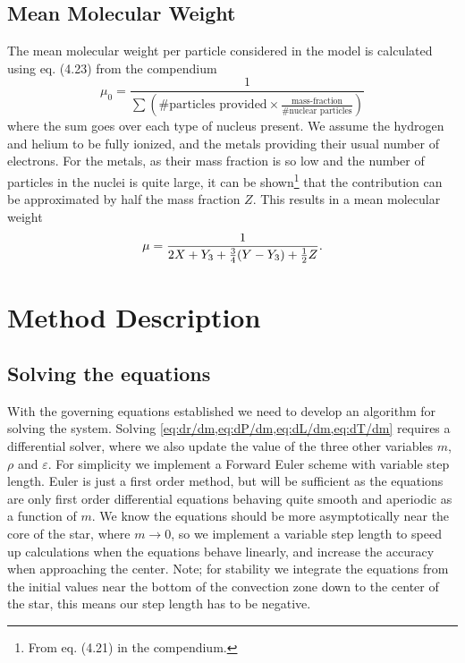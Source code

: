 \documentclass[11pt,a4paper,twocolumn,titlepage]{article}
\newcommand{\half}
{
\frac{1}{2}
}
\begin{document}
\subsection{Mean Molecular Weight} \label{subsec:governing/Mean_molecular_wieght}
The mean molecular weight per particle considered in the model is calculated using eq. (4.23) from the compendium
\[ \mu_0 = \frac{1}{\sum(\text{\# particles provided}\times\frac{\text{mass-fraction}}{\text{\# nuclear particles}})} \]
where the sum goes over each type of nucleus present. We assume the hydrogen and helium to be fully ionized, and the metals providing their usual number of electrons. For the metals, as their mass fraction is so low and the number of particles in the nuclei is quite large, it can be shown\footnote{From eq. (4.21) in the compendium.} that the contribution can be approximated by half the mass fraction $Z$. This results in a mean molecular weight
\begin{equation}
\mu = \frac{1}{2X + Y_3 +\frac{3}{4}\qty(Y-Y_3) + \half Z}. \label{eq:Mean_molecular_weight}
\end{equation}

\section{Method Description} \label{sec:Method}
\subsection{Solving the equations}\label{subsec:Method/Solving_equations}
With the governing equations established we need to develop an algorithm for solving the system. Solving \cref{eq:dr/dm,eq:dP/dm,eq:dL/dm,eq:dT/dm} requires a differential solver, where we also update the value of the three other variables $m$,$\rho$ and $\varepsilon$. For simplicity we implement a Forward Euler scheme with variable step length. Euler is just a first order method, but will be sufficient as the equations are only first order differential equations behaving quite smooth and aperiodic as a function of $m$. We know the equations should be more asymptotically near the core of the star, where $m\rightarrow 0$, so we implement a variable step length to speed up calculations when the equations behave linearly, and increase the accuracy when approaching the center. Note; for stability we integrate the equations from the initial values near the bottom of the convection zone down to the center of the star, this means our step length has to be negative.
\end{document}
